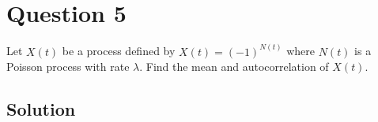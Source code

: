 \section*{Question 5}

Let \( X(t) \) be a process defined by \( X(t)=(-1)^{N(t)} \) where \( N(t) \) is a Poisson process with rate \( \lambda \).
Find the mean and autocorrelation of \( X(t) \).

\subsection*{Solution}
